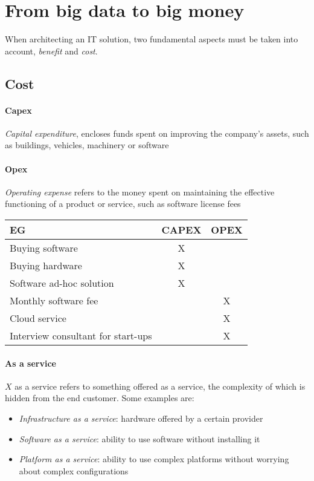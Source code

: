 \section{From big data to big money}
When architecting an IT solution, two fundamental aspects must be taken into account, \textit{benefit} and \textit{cost}.

\subsection{Cost}

\paragraph{Capex}
\textit{Capital expenditure}, encloses funds spent on improving the company's assets, such as buildings, vehicles, machinery or software

\paragraph{Opex}
\textit{Operating expense} refers to the money spent on maintaining the effective functioning of a product or service, such as software license fees

\begin{center}
    \begin{tabular}{lcc} 
    \toprule
        EG & CAPEX & OPEX \\
    \midrule
        Buying software & X &  \\ 
        Buying hardware & X &  \\
        Software ad-hoc solution  & X &  \\
        Monthly software fee &   & X \\
        Cloud service &   & X \\
        Interview consultant for start-ups &   & X \\
    \bottomrule
   \end{tabular}
\end{center}

\paragraph{As a service}
$X$ as a service refers to something offered as a service, the complexity of which is hidden from the end customer. Some examples are:
\begin{itemize}
    \item \textit{Infrastructure as a service}: hardware offered by a certain provider
    \item \textit{Software as a service}: ability to use software without installing it
    \item \textit{Platform as a service}: ability to use complex platforms without worrying about complex configurations
\end{itemize}


